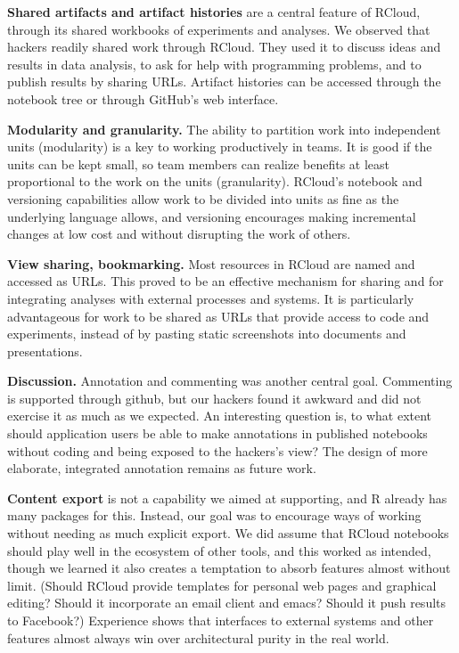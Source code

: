{\bf Shared artifacts and artifact histories} are a central feature of
RCloud, through its shared workbooks of experiments and analyses.  We
observed that hackers readily shared work through RCloud. They used it to
discuss ideas and results in data analysis, to ask for help with
programming problems, and to publish results by sharing URLs.  Artifact
histories can be accessed through the notebook tree or through GitHub's web
interface.

{\bf Modularity and granularity.} The ability to partition work into
independent units (modularity) is a key to working productively in teams.
It is good if the units can be kept small, so team members can realize
benefits at least proportional to the work on the units (granularity).
RCloud's notebook and versioning capabilities allow work to be divided
into units as fine as the underlying language allows, and versioning
encourages making incremental changes at low cost and without disrupting
the work of others. 

{\bf View sharing, bookmarking.} Most resources in RCloud are named
and accessed as URLs. This proved to be an effective mechanism for
sharing and for integrating analyses with external processes and systems.
It is particularly advantageous for work to be shared as URLs that
provide access to code and experiments, instead of by pasting static
screenshots into documents and presentations.

{\bf Discussion.} Annotation and commenting was another central goal.
Commenting is supported through github, but our hackers found it
awkward and did not exercise it as much as we expected.
An interesting question is, to what extent should application users
be able to make annotations in published notebooks without coding
and being exposed to the hackers's view? The design of
more elaborate, integrated annotation remains as future work.

{\bf Content export} is not a capability we aimed at supporting,
and R already has many packages for this. Instead, our goal was to
encourage ways of working without needing as much explicit export.
We did assume that RCloud notebooks should play well in the ecosystem
of other tools, and this worked as intended, though we learned it also
creates a temptation to absorb features almost without limit. (Should
RCloud provide templates for personal web pages and graphical
editing? Should it incorporate an email client and emacs?
Should it push results to Facebook?) Experience shows that interfaces
to external systems and other features almost always win over architectural
purity in the real world. 


